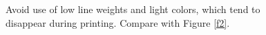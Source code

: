 \documentclass[final,leqno,onetabnum]{siamltex0315}
\begin{document}
\begin{figure}
\centering {}\qquad
{} \caption[]{Avoid use of low line weights and light colors, which 
tend to disappear during printing.  Compare with Figure {\rm \ref{f2}}.}
\label{f1}
\end{figure}
\end{document}
